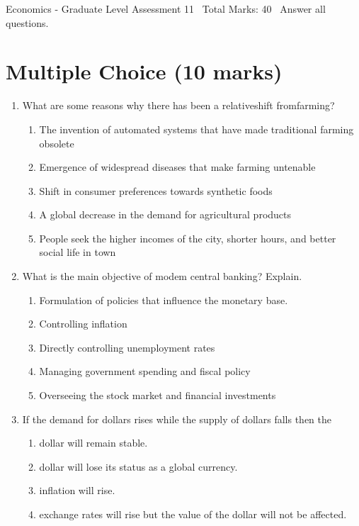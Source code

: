\documentclass[12pt]{article}
\begin{document}
\begin{center}
Economics - Graduate Level Assessment 11 \
Total Marks: 40 \
Answer all questions.
\end{center}

\section*{Multiple Choice (10 marks)}
\begin{enumerate}[label=\arabic*.]
\item What are some reasons why there has been a relativeshift fromfarming?
\begin{enumerate}[label=(\alph*)]
    \item The invention of automated systems that have made traditional farming obsolete
    \item Emergence of widespread diseases that make farming untenable
    \item Shift in consumer preferences towards synthetic foods
    \item A global decrease in the demand for agricultural products
    \item People seek the higher incomes of the city, shorter hours, and better social life in town
\end{enumerate}
\item What is the main objective of modem central banking? Explain.
\begin{enumerate}[label=(\alph*)]
    \item Formulation of policies that influence the monetary base.
    \item Controlling inflation
    \item Directly controlling unemployment rates
    \item Managing government spending and fiscal policy
    \item Overseeing the stock market and financial investments
\end{enumerate}
\item If the demand for dollars rises while the supply of dollars falls then the
\begin{enumerate}[label=(\alph*)]
    \item dollar will remain stable.
    \item dollar will lose its status as a global currency.
    \item inflation will rise.
    \item exchange rates will rise but the value of the dollar will not be affected.

\end{enumerate}
\end{enumerate}
\end{document}
